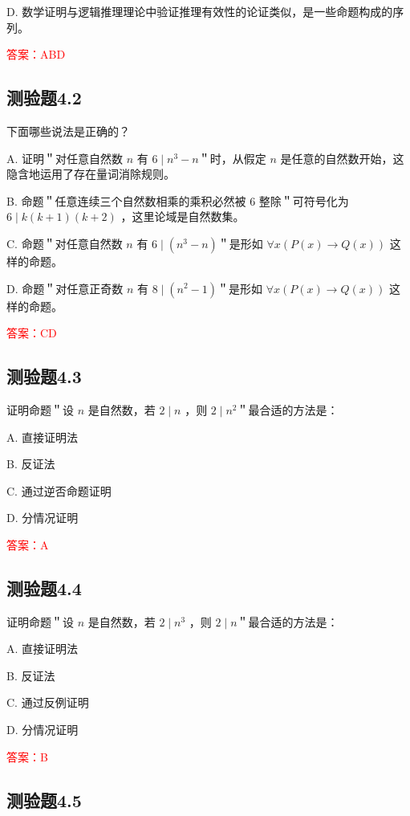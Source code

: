 \documentclass[UTF8, heading=true]{ctexart}
\begin{document}
D. 数学证明与逻辑推理理论中验证推理有效性的论证类似，是一些命题构成的序列。


\textcolor{red}{答案：ABD}


\subsection{测验题4.2}

下面哪些说法是正确的？

A. 证明＂对任意自然数 $n$ 有 $6 \mid n^3-n$＂时，从假定 $n$ 是任意的自然数开始，这隐含地运用了存在量词消除规则。

B. 命题＂任意连续三个自然数相乘的乘积必然被 6 整除＂可符号化为 $6 \mid k(k+1)(k+2)$ ，这里论域是自然数集。

C. 命题＂对任意自然数 $n$ 有 $6 \mid\left(n^3-n\right)$＂是形如 $\forall x(P(x) \rightarrow Q(x))$ 这样的命题。

D. 命题＂对任意正奇数 $n$ 有 $8 \mid\left(n^2-1\right)$＂是形如 $\forall x(P(x) \rightarrow Q(x))$ 这样的命题。

\textcolor{red}{答案：CD}

\subsection{测验题4.3}

证明命题＂设 $n$ 是自然数，若 $2 \mid n$ ，则 $2 \mid n^2$＂最合适的方法是：

A. 直接证明法

B. 反证法

C. 通过逆否命题证明

D. 分情况证明

\textcolor{red}{答案：A}


\subsection{测验题4.4}

证明命题＂设 $n$ 是自然数，若 $2 \mid n^3$ ，则 $2 \mid n$＂最合适的方法是：

A. 直接证明法

B. 反证法

C. 通过反例证明

D. 分情况证明

\textcolor{red}{答案：B}

\subsection{测验题4.5}
\end{document}
